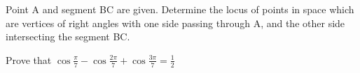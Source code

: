 \item Point A and segment BC are given. Determine the locus of points in space which are vertices of right angles with one side passing through A, and the other side intersecting the segment BC.

\item Prove that $\cos\frac{\pi}{7} - \cos\frac{2\pi}{7} + \cos\frac{3\pi}{7} = \frac{1}{2}$

    
